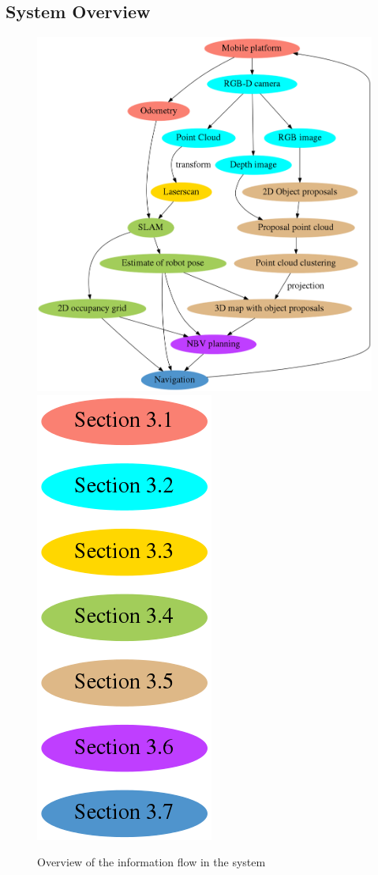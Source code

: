 
\subsection{System Overview} %
\label{sub:system_overview}

\begin{figure}[ht]
	\begin{center}
		\includegraphics[width=0.82\linewidth]{dot/overview.png} 
		\includegraphics[width=0.17\linewidth]{dot/legend.png} 
		\caption{Overview of the information flow in the system}
		\label{fig:overview}
	\end{center}
\end{figure}

